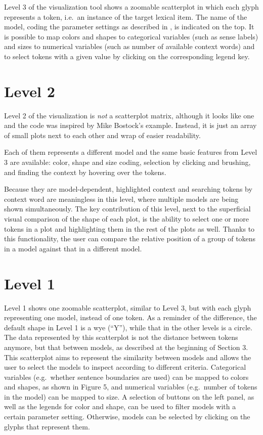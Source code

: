 \documentclass[
]{book}
\begin{document}
Level 3 of the visualization tool shows a zoomable scatterplot in which each glyph represents a token, i.e.~an instance of the target lexical item. The name of the model, coding the parameter settings as described in
, is indicated on the top. It is possible to map colors and shapes to categorical variables (such as sense labels) and sizes to numerical variables (such as number of available context words) and to select tokens with a given value by clicking on the corresponding legend key.

\hypertarget{level_2}{%
\section{Level 2}\label{level_2}}

Level 2 of the visualization is \emph{not} a scatterplot matrix, although it looks like one and the code was inspired by Mike Bostock's example. Instead, it is just an array of small plots next to each other and wrap of easier readability.

Each of them represents a different model and the same basic features from Level 3 are available: color, shape and size coding, selection by clicking and brushing, and finding the context by hovering over the tokens.

Because they are model-dependent, highlighted context and searching tokens by context word are meaningless in this level, where multiple models are being shown simultaneously. The key contribution of this level, next to the superficial visual comparison of the shape of each plot, is the ability to select one or more tokens in a plot and highlighting them in the rest of the plots as well. Thanks to this functionality, the user can compare the relative position of a group of tokens in a model against that in a different model.

\hypertarget{level_1}{%
\section{Level 1}\label{level_1}}

Level 1 shows one zoomable scatterplot, similar to Level 3, but with each glyph representing one model, instead of one token. As a reminder of the difference, the default shape in Level 1 is a wye (``Y''), while that in the other levels is a circle. The data represented by this scatterplot is not the distance between tokens anymore, but that between models, as described at the beginning of Section 3. This scatterplot aims to represent the similarity between models and allows the user to select the models to inspect according to different criteria. Categorical variables (e.g.~whether sentence boundaries are used) can be mapped to colors and shapes, as shown in Figure 5, and numerical variables (e.g.~number of tokens in the model) can be mapped to size. A selection of buttons on the left panel, as well as the legends for color and shape, can be used to filter models with a certain parameter setting. Otherwise, models can be selected by clicking on the glyphs that represent them.
\end{document}

